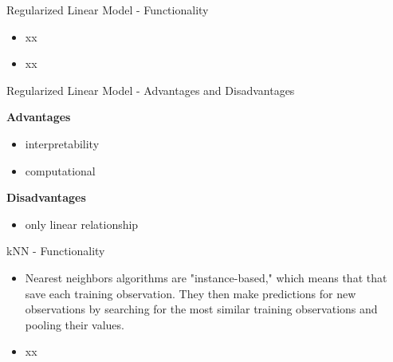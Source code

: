 \documentclass[11pt,compress,t,notes=noshow, xcolor=table]{beamer}
\begin{document}

\begin{frame}{Regularized Linear Model - Functionality}

\begin{itemize}
\item xx
\item xx
\end{itemize}


\end{frame}

\begin{frame}{Regularized Linear Model - Advantages and Disadvantages}

\textbf{Advantages}
\begin{itemize}
\item interpretability
\item computational 
\end{itemize}


\textbf{Disadvantages}
\begin{itemize}
\item only linear relationship
\end{itemize}
\end{frame}



\begin{frame}{kNN - Functionality}

\begin{itemize}
\item Nearest neighbors algorithms are "instance-based," which means that that save each training observation. They then make predictions for new observations by searching for the most similar training observations and pooling their values.
\item xx
\end{itemize}


\end{frame}
\end{document}
